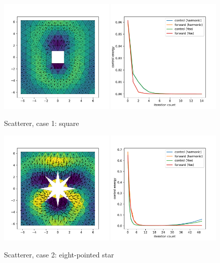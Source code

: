 \documentclass[utf8,english]{gradu3}
\begin{document}
\begin{figure}[H]
  \includegraphics[width=0.49\textwidth]{thesis/scatterer_square_solution.pdf}
  \includegraphics[width=0.49\textwidth]{thesis/scatterer_square_convergence.pdf}
  \caption{Scatterer, case 1: square}
  \label{fig:scatterer_square}
\end{figure}

\begin{figure}[H]
  \includegraphics[width=0.49\textwidth]{thesis/scatterer_star_8_solution.pdf}
  \includegraphics[width=0.49\textwidth]{thesis/scatterer_star_8_convergence.pdf}
  \caption{Scatterer, case 2: eight-pointed star}
  \label{fig:scatterer_star_8}
\end{figure}
\end{document}

